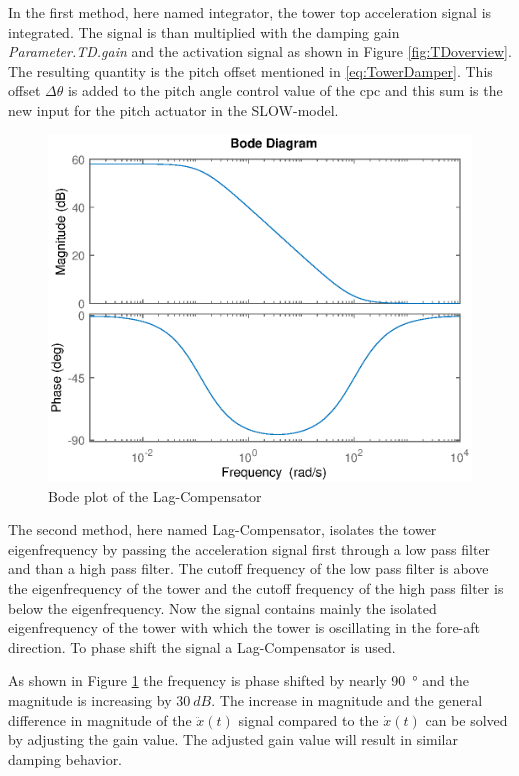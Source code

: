 In the first method, here named integrator, the tower top acceleration signal is integrated.
The signal is than multiplied with the damping gain \textit{Parameter.TD.gain} and the activation signal as shown in Figure \ref{fig:TDoverview}.
The resulting quantity is the pitch offset mentioned in \ref{eq:TowerDamper}.
This offset $\Delta\theta$ is added to the pitch angle control value of the \gls{cpc} and this sum is the new input for the pitch actuator in the SLOW-model.

\begin{figure}[h]
	\centering	
	\includegraphics[width=12cm]{Figures/BodeLagCompensator.eps}
	\caption{Bode plot of the Lag-Compensator}
	\label{fig:BodeLag}
\end{figure}

The second method, here named Lag-Compensator, isolates the tower eigenfrequency by passing the acceleration signal first through a low pass filter and than a high pass filter. The cutoff frequency of the low pass filter is above the eigenfrequency of the tower and the cutoff frequency of the high pass filter is below the eigenfrequency. Now the signal contains mainly the isolated eigenfrequency of the tower with which the tower is oscillating in the fore-aft direction. To phase shift the signal a Lag-Compensator is used.


As shown in Figure \ref{fig:BodeLag} the frequency is phase shifted by nearly \SI{90}{\degree} and the magnitude is increasing by $\SI{30}{dB}$. The increase in magnitude and the general difference in magnitude of the $\ddot{x}(t)$ signal compared to the $\dot{x}(t)$ can be solved by adjusting the gain value. The adjusted gain value will result in similar damping behavior.

